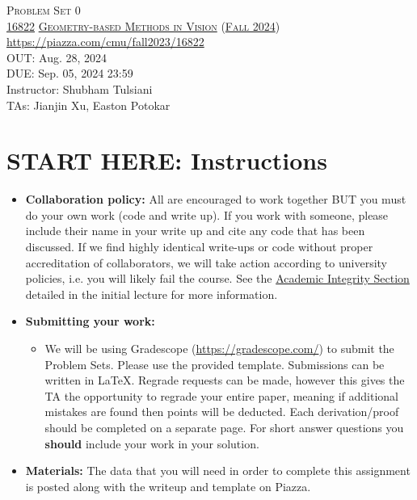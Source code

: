\documentclass[11pt,addpoints,answers]{exam}
\title{\textsc{\hwName}} %
\author{}
\date{}
\date{}
\numberwithin{equation}{section} %
\numberwithin{figure}{section} %
\numberwithin{table}{section} %
\newcommand{\courseNum}{\href{https://geometric3d.github.io}{16822}}
\newcommand{\courseName}{\href{https://geometric3d.github.io}{Geometry-based Methods in Vision}}
\newcommand{\courseSem}{\href{https://geometric3d.github.io}{Fall 2024}}
\newcommand{\courseUrl}{\url{https://piazza.com/cmu/fall2023/16822}}
\newcommand{\hwNum}{Problem Set 0}
\newcommand{\hwTopic}{Linear Algebra }
\newcommand{\outDate}{Aug. 28, 2024}
\newcommand{\dueDate}{Sep. 05, 2024 23:59}
\newcommand{\instructorName}{Shubham Tulsiani}
\newcommand{\taNames}{Jianjin Xu, Easton Potokar}
\begin{document}
\section*{}
\begin{center}
  \textsc{\LARGE \hwNum} \\
  \vspace{1em}
  \textsc{\large \courseNum{} \courseName{} (\courseSem)} \\
  \courseUrl\\
  \vspace{1em}
  OUT: \outDate \\
  DUE: \dueDate \\
  Instructor: \instructorName \\
  TAs: \taNames
\end{center}

\section*{START HERE: Instructions}
\begin{itemize}
\item \textbf{Collaboration policy:} All are encouraged to work together BUT you must do your own work (code and write up). If you work with someone, please include their name in your write up and cite any code that has been discussed. If we find highly identical write-ups or code without proper accreditation of collaborators, we will take action according to university policies, i.e. you will likely fail the course. See the \href{https://www.dropbox.com/s/z6o0tinc9eaez46/L01_Overview.pdf?dl=0}{Academic Integrity Section} detailed in the initial lecture for more information.


\item\textbf{Submitting your work:}

\begin{itemize}

\item We will be using Gradescope (\url{https://gradescope.com/}) to submit the Problem Sets. Please use the provided template. Submissions can be written in LaTeX. Regrade requests can be made, however this gives the TA the opportunity to regrade your entire paper, meaning if additional mistakes are found then points will be deducted.
Each derivation/proof should be  completed on a separate page. For short answer questions you \textbf{should} include your work in your solution.  
\end{itemize}

\item \textbf{Materials:} The data that you will need in order to complete this assignment is posted along with the writeup and template on Piazza.

\end{itemize}
\end{document}
